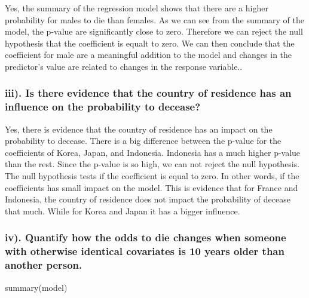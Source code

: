 \documentclass[
]{article}
\newenvironment{Shaded}{\begin{snugshade}}{\end{snugshade}}
\newcommand{\FunctionTok}[1]{\textcolor[rgb]{0.00,0.00,0.00}{#1}}
\newcommand{\NormalTok}[1]{#1}
\begin{document}
Yes, the summary of the regression model shows that there are a higher
probability for males to die than females. As we can see from the
summary of the model, the p-value are significantly close to zero.
Therefore we can reject the null hypothesis that the coefficient is
equalt to zero. We can then conclude that the coefficient for male are a
meaningful addition to the model and changes in the predictor's value
are related to changes in the response variable..

\hypertarget{iii.-is-there-evidence-that-the-country-of-residence-has-an-influence-on-the-probability-to-decease}{%
\subsubsection{iii). Is there evidence that the country of residence has
an influence on the probability to
decease?}\label{iii.-is-there-evidence-that-the-country-of-residence-has-an-influence-on-the-probability-to-decease}}

Yes, there is evidence that the country of residence has an impact on
the probability to decease. There is a big difference between the
p-value for the coefficients of Korea, Japan, and Indonesia. Indonesia
has a much higher p-value than the rest. Since the p-value is so high,
we can not reject the null hypothesis. The null hypothesis tests if the
coefficient is equal to zero. In other words, if the coefficients has
small impact on the model. This is evidence that for France and
Indonesia, the country of residence does not impact the probability of
decease that much. While for Korea and Japan it has a bigger influence.

\hypertarget{iv.-quantify-how-the-odds-to-die-changes-when-someone-with-otherwise-identical-covariates-is-10-years-older-than-another-person.}{%
\subsubsection{iv). Quantify how the odds to die changes when someone
with otherwise identical covariates is 10 years older than another
person.}\label{iv.-quantify-how-the-odds-to-die-changes-when-someone-with-otherwise-identical-covariates-is-10-years-older-than-another-person.}}

\begin{Shaded}
\begin{Highlighting}[]
\FunctionTok{summary}\NormalTok{(model)}
\end{Highlighting}
\end{Shaded}
\end{document}
